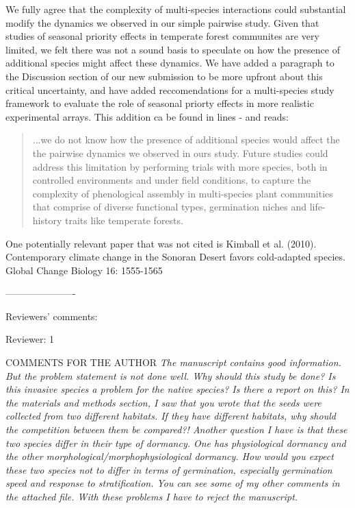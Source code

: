 \documentclass[11pt]{article}
\begin{document}
We fully agree that the complexity of multi-species interactions could substantial modify the dynamics we observed in our simple pairwise study. Given that studies of seasonal priority effects in temperate forest communites are very limited, we felt there was not a sound basis to speculate on how the presence of additional species might affect these dynamics. We have added a paragraph to the Discussion section of our new submission to be more upfront about this critical uncertainty, and have added reccomendations for a multi-species study framework to evaluate the role of seasonal priorty effects in more realistic experimental arrays. This addition ca be found in lines - and reads:
\begin{quote}...we do not know how the presence of additional species would affect the the pairwise dynamics we observed in ours study. Future studies could address this limitation by performing trials with more species, both in controlled environments and under field conditions, to capture the complexity of phenological assembly in multi-species plant communities that comprise of diverse functional types, germination niches and life-history traits like temperate forests.\end{quote}



One potentially relevant paper that was not cited is Kimball et al. (2010). Contemporary climate change in the Sonoran Desert favors cold-adapted species. Global Change Biology 16: 1555-1565

----------------------

Reviewers’ comments:

Reviewer: 1

COMMENTS FOR THE AUTHOR
\emph{The manuscript contains good information. But the problem statement is not done well. Why should this study be done? Is this invasive species a problem for the native species? Is there a report on this? In the materials and methods section, I saw that you wrote that the seeds were collected from two different habitats. If they have different habitats, why should the competition between them be compared?! Another question I have is that these two species differ in their type of dormancy. One has physiological dormancy and the other morphological/morphophysiological dormancy. How would you expect these two species not to differ in terms of germination, especially germination speed and response to stratification. You can see some of my other comments in the attached file. With these problems I have to reject the manuscript.}
\end{document}

